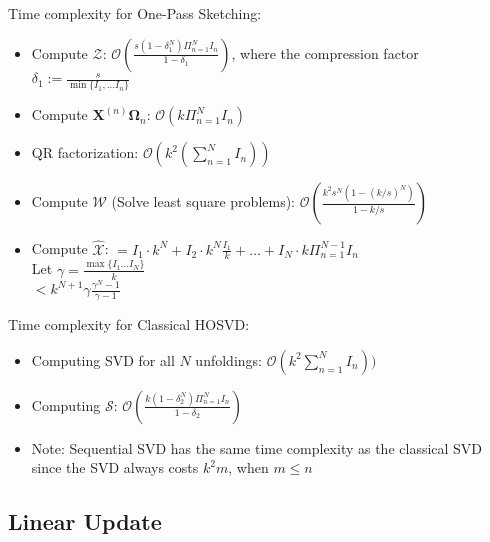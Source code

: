 Time complexity for One-Pass Sketching: \\ 
\begin{itemize}
    \item Compute $\mathscr{Z}$: $ \mathcal{O}(\frac{s(1-\delta_1^N)\Pi_{n = 1}^N I_n}{1-\delta_1})$, where the compression factor $\delta_1 := \frac{s}{\min\{I_1, \dots I_n\}}$
    \item Compute $\mathbf{X}^{(n)} \mathbf{\Omega}_n$: $\mathcal{O}(k \Pi_{n=1}^N I_n)$ 
    \item QR factorization: $\mathcal{O}(k^2(\sum_{n =1}^N I_n )) $  
    \item Compute $\mathscr{W}$ (Solve least square problems): $\mathcal{O}(\frac{k^2s^N(1-(k/s)^N)}{1-k/s})$
    \item Compute $\hat{\mathscr{X}}$:
    $= I_1\cdot k^N + I_2 \cdot k^N \frac{I_1}{k} + \dots + I_N\cdot k \Pi_{n = 1}^{N-1} I_n$ \\ 
    Let $\gamma = \frac{\max \{I_1 \dots I_N\}}{k}$ \\ 
    $<  k^{N+1}\gamma \frac{\gamma^N -1}{\gamma - 1}$
\end{itemize}

Time complexity for Classical HOSVD: \\
\begin{itemize}
    \item Computing SVD for all $N$ unfoldings: $\mathscr{O}(k^2\sum_{n =1}^NI_n))$ 
    \item Computing $\mathscr{S}$: 
    $\mathcal{O}(\frac{k(1-\delta_2^N)\Pi_{n = 1}^N I_n}{1-\delta_2})$ 
    \item Note: Sequential SVD has the same time complexity as the classical SVD since the SVD always costs $k^2m$, when $m\leq n$
\end{itemize}

\subsection{Linear Update}

